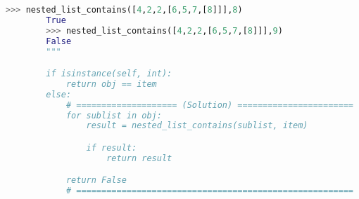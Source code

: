\documentclass[12pt]{article}
\begin{document}
\begin{enumerate}[a.]
\begin{lstlisting}[language=python, caption={worksheet\_16\_q1c\_solution}]
        >>> nested_list_contains([4,2,2,[6,5,7,[8]]],8)
        True
        >>> nested_list_contains([4,2,2,[6,5,7,[8]]],9)
        False
        """

        if isinstance(self, int):
            return obj == item
        else:
            # ==================== (Solution) =======================
            for sublist in obj:
                result = nested_list_contains(sublist, item)

                if result:
                    return result

            return False
            # =======================================================
    \end{lstlisting}


\end{enumerate}
\end{document}

